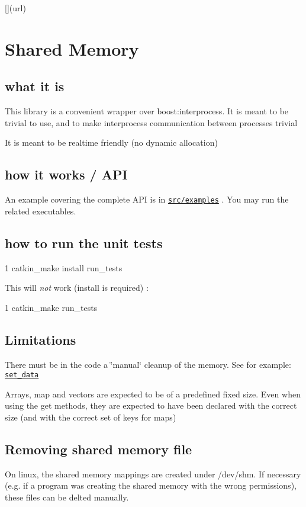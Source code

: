 \mbox{[}\mbox{]}(url)

\section*{Shared Memory}

\subsection*{what it is}


\begin{DoxyItemize}
\item This library is a convenient wrapper over boost\+:interprocess. It is meant to be trivial to use, and to make interprocess communication between processes trivial
\item It is meant to be realtime friendly (no dynamic allocation)
\end{DoxyItemize}

\subsection*{how it works / A\+PI}

An example covering the complete A\+PI is in \href{https://git-amd.tuebingen.mpg.de/amd-clmc/shared_memory/tree/master/src/examples}{\tt src/examples} . You may run the related executables.

\subsection*{how to run the unit tests}


\begin{DoxyCode}
1 catkin\_make install run\_tests
\end{DoxyCode}


This will {\itshape not} work (\textquotesingle{}install\textquotesingle{} is required) \+:


\begin{DoxyCode}
1 catkin\_make run\_tests
\end{DoxyCode}


\subsection*{Limitations}


\begin{DoxyItemize}
\item There must be in the code a \char`\"{}manual\char`\"{} cleanup of the memory. See for example\+: \href{https://git-amd.tuebingen.mpg.de/amd-clmc/shared_memory/blob/master/src/examples/set_data.cpp#L16}{\tt set\+\_\+data}
\item Arrays, map and vectors are expected to be of a predefined fixed size. Even when using the \textquotesingle{}get\textquotesingle{} methods, they are expected to have been declared with the correct size (and with the correct set of keys for maps)
\end{DoxyItemize}

\subsection*{Removing shared memory file}

On linux, the shared memory mappings are created under {\ttfamily /dev/shm}. If necessary (e.\+g. if a program was creating the shared memory with the wrong permissions), these files can be delted manually. 